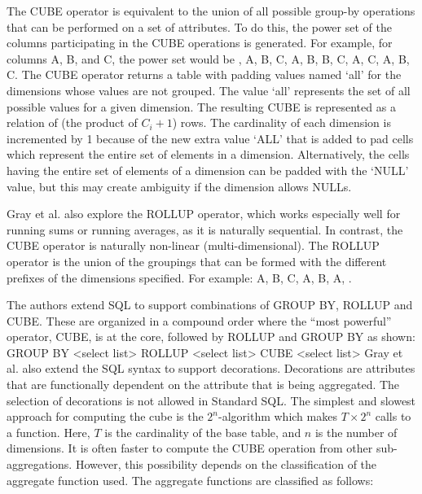 \documentclass[]{article}
\begin{document}
 The CUBE operator is equivalent to the union of all possible group-by operations that can be performed on a set of
attributes. To do this, the power set of the columns participating in the CUBE operations is generated. For example, for
columns A, B, and C, the power set would be {{}, {A}, {B}, {C}, {A, B}, {B, C}, {A, C}, {A, B, C}}. The CUBE operator returns
a table with padding values named ‘all’ for the dimensions whose values are not grouped. The value ‘all’ represents the set of
all possible values for a given dimension. The resulting CUBE is represented as a relation of (the product of $C_i+1$) rows.
The cardinality of each dimension is incremented by 1 because of the new extra value ‘ALL’ that is added to pad cells which
represent the entire set of elements in a dimension. Alternatively, the cells having the entire set of elements of a dimension
can be padded with the ‘NULL’ value, but this may create ambiguity if the dimension allows NULLs.
 
Gray et al. also explore the ROLLUP operator, which works especially well for running sums or running averages, as it is
naturally sequential. In contrast, the CUBE operator is naturally non-linear (multi-dimensional). The ROLLUP operator is the
union of the groupings that can be formed with the different prefixes of the dimensions specified. For example: {{A, B, C},
{A, B}, {A}, {}}.

The authors extend SQL to support combinations of GROUP BY, ROLLUP and CUBE. These are organized in a compound order where the
“most powerful” operator, CUBE, is at the core, followed by ROLLUP and GROUP BY as shown:
GROUP BY <select list>
	ROLLUP <select list>
		CUBE <select list>
Gray et al. also extend the SQL syntax to support decorations. Decorations are attributes that are functionally dependent on
the attribute that is being aggregated. The selection of decorations is not allowed in Standard SQL. The simplest and slowest
approach for computing the cube is the $2^n$-algorithm which makes $T\times2^n$ calls to a function. Here, $T$ is the cardinality of
the base table, and $n$ is the number of dimensions. It is often faster to compute the CUBE operation from other
sub-aggregations. However, this possibility depends on the classification of the aggregate function used. The aggregate
functions are classified as follows:
\end{document}
